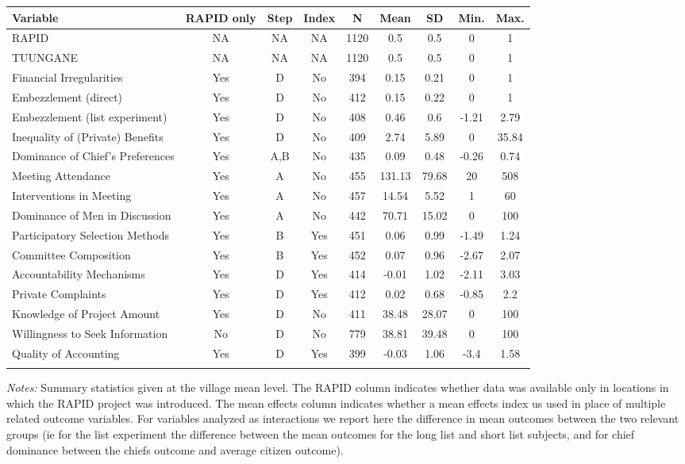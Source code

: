 \begin{tabular}{lcccccccc}  
 	Variable &	RAPID only &  Step & Index & N	&	Mean	&	SD	&	Min. & Max.	 \\ \hline \hline  
 RAPID&NA&NA&NA&1120&0.5&0.5&0&1 \\  
 TUUNGANE&NA&NA&NA&1120&0.5&0.5&0&1 \\  
 Financial Irregularities&Yes&D&No&394&0.15&0.21&0&1 \\  
 Embezzlement (direct)&Yes&D&No&412&0.15&0.22&0&1 \\  
 Embezzlement (list experiment)&Yes&D&No&408&0.46&0.6&-1.21&2.79 \\  
 Inequality of (Private) Benefits&Yes&D&No&409&2.74&5.89&0&35.84 \\  
 Dominance of Chief's Preferences&Yes&A,B&No&435&0.09&0.48&-0.26&0.74 \\  
 Meeting Attendance&Yes&A&No&455&131.13&79.68&20&508 \\  
 Interventions in Meeting&Yes&A&No&457&14.54&5.52&1&60 \\  
 Dominance of Men in Discussion&Yes&A&No&442&70.71&15.02&0&100 \\  
 Participatory Selection Methods&Yes&B&Yes&451&0.06&0.99&-1.49&1.24 \\  
 Committee Composition&Yes&B&Yes&452&0.07&0.96&-2.67&2.07 \\  
 Accountability Mechanisms&Yes&D&Yes&414&-0.01&1.02&-2.11&3.03 \\  
 Private Complaints&Yes&D&Yes&412&0.02&0.68&-0.85&2.2 \\  
 Knowledge of Project Amount&Yes&D&No&411&38.48&28.07&0&100 \\  
 Willingness to Seek Information&No&D&No&779&38.81&39.48&0&100 \\  
 Quality of Accounting&Yes&D&Yes&399&-0.03&1.06&-3.4&1.58 \\  
 \hline \hline  
 \label{table_ss}  
 \end{tabular}  
 \begin{flushleft}\textit{Notes:} Summary statistics given at the village mean level. The RAPID column indicates whether data was available only in locations in which the RAPID project was introduced. The mean effects column indicates whether a mean effects index us used in place of multiple related outcome variables. 
For variables analyzed as interactions we report here the difference in mean outcomes between the two relevant groups (ie for the list
experiment the difference between the mean outcomes for the long list and short list subjects, and for chief dominance between the chiefs outcome and average citizen outcome).\end{flushleft}  
